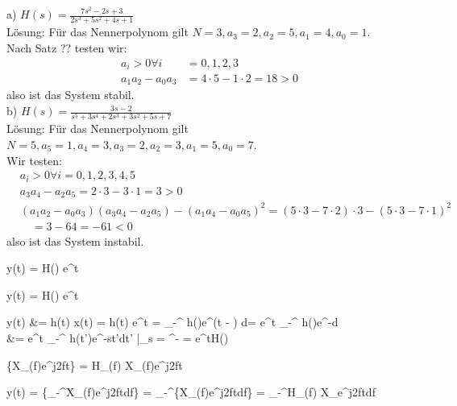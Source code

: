 \begin{tbox}
	a) $ H(s) = \frac{7s^2 - 2s + 3}{2s^3 + 5s^2 + 4s + 1} $\\
	Lösung: Für das Nennerpolynom gilt $ N = 3, a_3 = 2, a_2 = 5, a_1 = 4, a_0 = 1 $.\\
	Nach Satz ?? testen wir:
	\begin{align*}
		a_i > 0 \forall i &= 0, 1, 2, 3\\
		a_1a_2 - a_0a_3 &= 4 \cdot 5 - 1 \cdot 2 = 18 > 0
	\end{align*}
	also ist das System stabil.\\
	b) $ H(s) = \frac{3s - 2}{s^5 + 3s^4 + 2s^3 + 3s^2 + 5s + 7} $\\
	Lösung: Für das Nennerpolynom gilt $ N = 5, a_5 = 1, a_4 = 3, a_3 = 2, a_2 = 3, a_1 = 5, a_0 = 7$.\\
	Wir testen:
	\begin{align*}
		&a_i > 0 \forall i = 0, 1, 2, 3, 4, 5\\
		&a_3a_4 - a_2a_5 = 2 \cdot 3 - 3 \cdot 1 = 3 > 0\\
		&(a_1a_2 - a_0a_3)(a_3a_4 - a_2a_5) - (a_1a_4 - a_0a_5)^2 = (5 \cdot 3 - 7 \cdot 2) \cdot 3 - (5 \cdot 3 - 7 \cdot 1)^2\\ 
		&\quad = 3 - 64 = -61 < 0
	\end{align*}
	also ist das System instabil.
\end{tbox}

\begin{abox}
	y(t) = H(\alpha) \cdot e^{\alpha t}
\end{abox}

\begin{abox}
	y(t) = H(\alpha) \cdot e^{\alpha t}
\end{abox}

\begin{abox}
	y(t) &= h(t) \ast x(t) = h(t) \ast e^{\alpha t} = \int_{-\infty}^{\infty} h(\tau)e^{\alpha (t - \tau)} d\tau = e^{\alpha t}  \int_{-\infty}^{\infty} h(\tau)e^{-\alpha\tau}d\tau\\ 
	&= e^{\alpha t}  \int_{-\infty}^{\infty} h(t')e^{-st'}dt' |_{s = \alpha}^{-\infty} = e^{\alpha t}\cdot H(\alpha)
\end{abox}

\begin{abox}
	\{X_(f)e^{j2\pi ft}\} = H_(f) \cdot X_(f)e^{j2\pi ft}
\end{abox}

\begin{abox}
	y(t) = \{\int_{-\infty}^{\infty}X_(f)e^{j2\pi ft}df\} = \int_{-\infty}^{\infty}\{X_(f)e^{j2\pi ft}df\} = \int_{-\infty}^{\infty}H_(f) \cdot X_e^{j2\pi ft}df
\end{abox}

